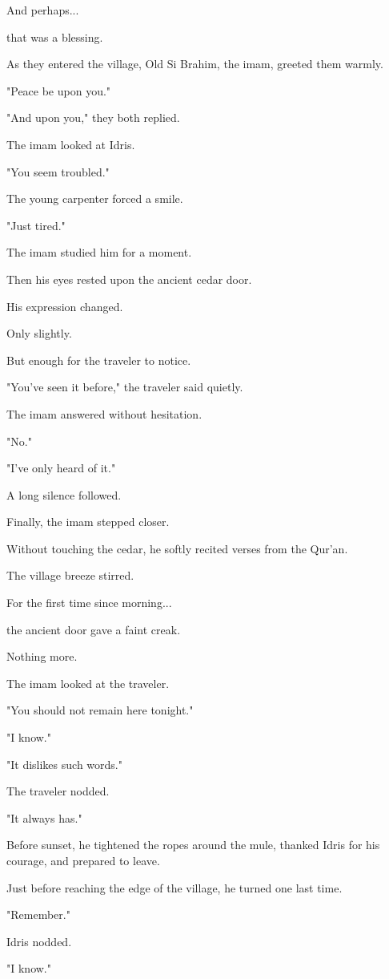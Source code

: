 \documentclass[12pt,openany]{book}
\begin{document}
And perhaps...

that was a blessing.

As they entered the village, Old Si Brahim, the imam, greeted them warmly.

"Peace be upon you."

"And upon you," they both replied.

The imam looked at Idris.

"You seem troubled."

The young carpenter forced a smile.

"Just tired."

The imam studied him for a moment.

Then his eyes rested upon the ancient cedar door.

His expression changed.

Only slightly.

But enough for the traveler to notice.

"You've seen it before," the traveler said quietly.

The imam answered without hesitation.

"No."

"I've only heard of it."

A long silence followed.

Finally, the imam stepped closer.

Without touching the cedar, he softly recited verses from the Qur'an.

The village breeze stirred.

For the first time since morning...

the ancient door gave a faint creak.

Nothing more.

The imam looked at the traveler.

"You should not remain here tonight."

"I know."

"It dislikes such words."

The traveler nodded.

"It always has."

Before sunset, he tightened the ropes around the mule, thanked Idris for his courage, and prepared to leave.

Just before reaching the edge of the village, he turned one last time.

"Remember."

Idris nodded.

"I know."
\end{document}
